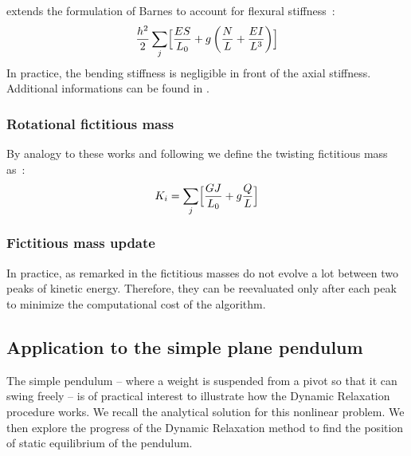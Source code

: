  extends the formulation of Barnes to account for flexural stiffness~:
\begin{equation}
	\frac{h^2}{2} \sum_j \Bigl[\frac{ES}{L_0} + g \left(\frac{N}{L} + \frac{EI}{L^3} \right) \Bigr]
\end{equation}
In practice, the bending stiffness is negligible in front of the axial stiffness. Additional informations can be found in \cite{Lewis2003,Rodriguez2011a}.

\subsubsection{Rotational fictitious mass}
By analogy to these works and following \cite{Lefevre2017} we define the twisting fictitious mass as~:
\begin{equation}
	K_i = \sum_j \Bigl[\frac{GJ}{L_0} + g \frac{Q}{L} \Bigr]
\end{equation}

\subsubsection{Fictitious mass update}
In practice, as remarked in \cite{Douthe2007} the fictitious masses do not evolve a lot between two peaks of kinetic energy. Therefore, they can be reevaluated only after each peak to minimize the computational cost of the algorithm.

\subsection{Application to the simple plane pendulum}
The simple pendulum -- where a weight is suspended from a pivot so that it can swing freely -- is of practical interest to illustrate how the Dynamic Relaxation procedure works. We recall the analytical solution for this nonlinear problem. We then explore the progress of the Dynamic Relaxation method to find the position of static equilibrium of the pendulum.

